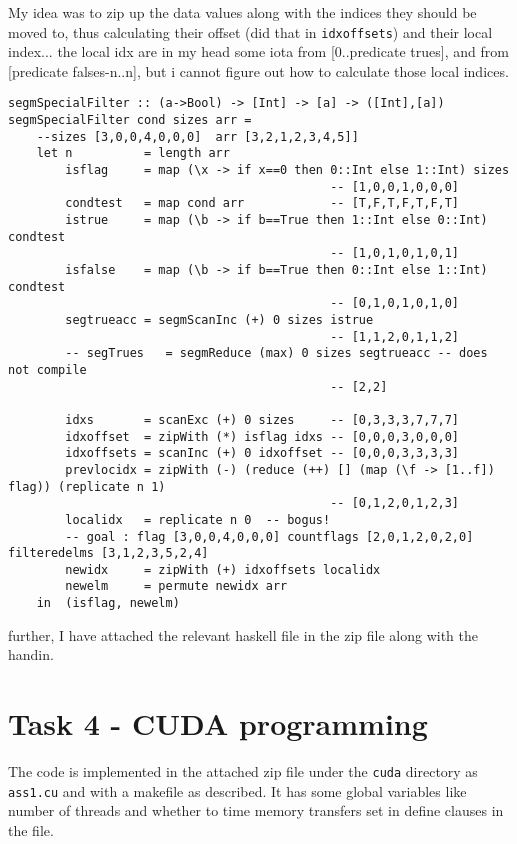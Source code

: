 \documentclass[a4paper,10pt]{article}
\begin{document}
My idea was to zip up the data values along with the indices they should be moved to, thus calculating their offset (did that in \texttt{idxoffsets}) and their local index...
the local idx are in my head some iota from [0..predicate trues], and from [predicate falses-n..n], but i cannot figure out how to calculate those local indices.

\begin{verbatim}
segmSpecialFilter :: (a->Bool) -> [Int] -> [a] -> ([Int],[a])
segmSpecialFilter cond sizes arr =
    --sizes [3,0,0,4,0,0,0]  arr [3,2,1,2,3,4,5]]
    let n          = length arr
        isflag     = map (\x -> if x==0 then 0::Int else 1::Int) sizes
                                             -- [1,0,0,1,0,0,0]
        condtest   = map cond arr            -- [T,F,T,F,T,F,T]
        istrue     = map (\b -> if b==True then 1::Int else 0::Int) condtest
                                             -- [1,0,1,0,1,0,1]
        isfalse    = map (\b -> if b==True then 0::Int else 1::Int) condtest
                                             -- [0,1,0,1,0,1,0]
        segtrueacc = segmScanInc (+) 0 sizes istrue
                                             -- [1,1,2,0,1,1,2]
        -- segTrues   = segmReduce (max) 0 sizes segtrueacc -- does not compile
                                             -- [2,2]

        idxs       = scanExc (+) 0 sizes     -- [0,3,3,3,7,7,7]
        idxoffset  = zipWith (*) isflag idxs -- [0,0,0,3,0,0,0]
        idxoffsets = scanInc (+) 0 idxoffset -- [0,0,0,3,3,3,3]
        prevlocidx = zipWith (-) (reduce (++) [] (map (\f -> [1..f]) flag)) (replicate n 1)
                                             -- [0,1,2,0,1,2,3]
        localidx   = replicate n 0  -- bogus!
        -- goal : flag [3,0,0,4,0,0,0] countflags [2,0,1,2,0,2,0] filteredelms [3,1,2,3,5,2,4]
        newidx     = zipWith (+) idxoffsets localidx
        newelm     = permute newidx arr
    in  (isflag, newelm)
\end{verbatim}


further, I have attached the relevant haskell file in the zip file along with the handin.

\vfill

\section{Task 4 - CUDA programming}

The code is implemented in the attached zip file under the \texttt{cuda} directory as \texttt{ass1.cu} and with a makefile as described.
It has some global variables like number of threads and whether to time memory transfers set in define clauses in the file.
\end{document}
